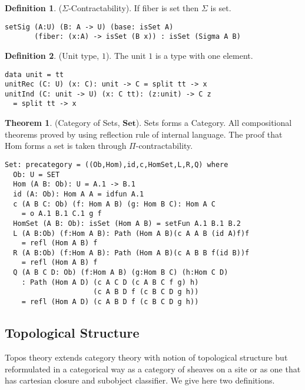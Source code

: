 \documentclass{article}
\theoremstyle{definition}
\newtheorem{definition}{Definition}
\newtheorem{theorem}{Theorem}
\begin{document}
\begin{definition} ($\Sigma$-Contractability).
If fiber is set then $\Sigma$ is set.
\begin{lstlisting}
setSig (A:U) (B: A -> U) (base: isSet A)
       (fiber: (x:A) -> isSet (B x)) : isSet (Sigma A B)
\end{lstlisting}
\end{definition}

\begin{definition} (Unit type, $1$).
The unit $1$ is a type with one element.
\begin{lstlisting}
data unit = tt
unitRec (C: U) (x: C): unit -> C = split tt -> x
unitInd (C: unit -> U) (x: C tt): (z:unit) -> C z
  = split tt -> x
\end{lstlisting}
\end{definition}

\begin{theorem} (Category of Sets, $\mathbf{Set}$).
Sets forms a Category.
All compositional theorems proved by using reflection rule of internal language.
The proof that $\mathrm{Hom}$ forms a set is taken through $\Pi$-contractability.
\begin{lstlisting}
Set: precategory = ((Ob,Hom),id,c,HomSet,L,R,Q) where
  Ob: U = SET
  Hom (A B: Ob): U = A.1 -> B.1
  id (A: Ob): Hom A A = idfun A.1
  c (A B C: Ob) (f: Hom A B) (g: Hom B C): Hom A C
    = o A.1 B.1 C.1 g f
  HomSet (A B: Ob): isSet (Hom A B) = setFun A.1 B.1 B.2
  L (A B:Ob) (f:Hom A B): Path (Hom A B)(c A A B (id A)f)f
    = refl (Hom A B) f
  R (A B:Ob) (f:Hom A B): Path (Hom A B)(c A B B f(id B))f
    = refl (Hom A B) f
  Q (A B C D: Ob) (f:Hom A B) (g:Hom B C) (h:Hom C D)
    : Path (Hom A D) (c A C D (c A B C f g) h)
                     (c A B D f (c B C D g h))
    = refl (Hom A D) (c A B D f (c B C D g h))
\end{lstlisting}
\end{theorem}

\newpage
\subsection{Topological Structure}

Topos theory extends category theory with notion of topological
structure but reformulated in a categorical way
as a category of sheaves on a site or as one that has cartesian closure
and subobject classifier. We give here two definitions.
\end{document}

